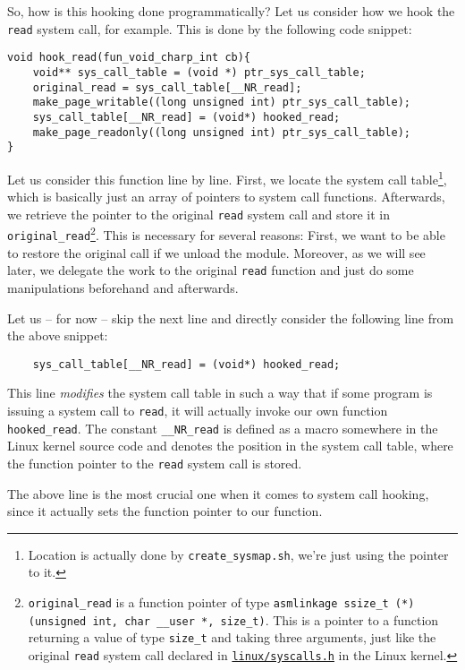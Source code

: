 \documentclass[10pt, letterpaper]{scrartcl}
\begin{document}
So, how is this hooking done programmatically? Let us consider how we hook the \texttt{read} system call, for example. This is done by the following code snippet:

\begin{verbatim}
void hook_read(fun_void_charp_int cb){
    void** sys_call_table = (void *) ptr_sys_call_table;
    original_read = sys_call_table[__NR_read];
    make_page_writable((long unsigned int) ptr_sys_call_table);
    sys_call_table[__NR_read] = (void*) hooked_read;
    make_page_readonly((long unsigned int) ptr_sys_call_table);
}
\end{verbatim}

Let us consider this function line by line. First, we locate the system call table\footnote{Location is actually done by \texttt{create\_sysmap.sh}, we're just using the pointer to it.}, which is basically just an array of pointers to system call functions. Afterwards, we retrieve the pointer to the original \texttt{read} system call and store it in  \texttt{original\_read}\footnote{\texttt{original\_read} is a function pointer of type \texttt{asmlinkage ssize\_t (*)(unsigned int, char \_\_user *, size\_t)}. This is a pointer to a function returning a value of type \texttt{size\_t} and taking three arguments, just like the original \texttt{read} system call declared in \href{http://lxr.linux.no/linux+v2.6.32/arch/x86/include/asm/syscalls.h}{\texttt{linux/syscalls.h}} in the Linux kernel.}. This is necessary for several reasons: First, we want to be able to restore the original call if we unload the module. Moreover, as we will see later, we delegate the work to the original \texttt{read} function and just do some manipulations beforehand and afterwards.

Let us -- for now -- skip the next line and directly consider the following line from the above snippet:

\begin{verbatim}
    sys_call_table[__NR_read] = (void*) hooked_read;
\end{verbatim}

This line \emph{modifies} the system call table in such a way that if some program is issuing a system call to \texttt{read}, it will actually invoke our own function \texttt{hooked\_read}. The constant \texttt{\_\_NR\_read} is defined as a macro somewhere in the Linux kernel source code and denotes the position in the system call table, where the function pointer to the \texttt{read} system call is stored.

The above line is the most crucial one when it comes to system call hooking, since it actually sets the function pointer to our function.
\end{document}
